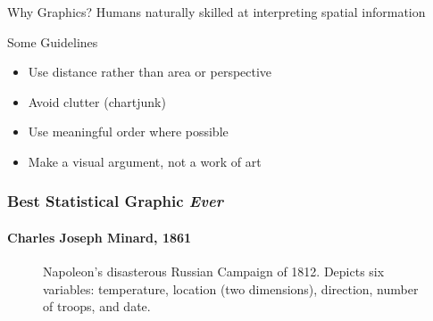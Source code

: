 \documentclass{beamer}
\begin{document}
\begin{frame}
\begin{columns}
	\vspace{5em}
\end{columns}

\end{frame}

\begin{frame}

	\begin{block}{Why Graphics?}
	Humans naturally skilled at interpreting spatial information
	\end{block}


\begin{block}{Some Guidelines}
	\begin{itemize}
		\item Use \alert{distance} rather than area or perspective
		\item Avoid clutter (chartjunk)
		\item Use meaningful order where possible
		\item Make a \alert{visual argument}, not a work of art
	\end{itemize}
\end{block}

\end{frame}

\begin{frame}
\singlespacing
\frametitle{Best Statistical Graphic \emph{Ever}}
\framesubtitle{Charles Joseph Minard, 1861 }
\begin{figure}
\caption{Napoleon's disasterous Russian Campaign of 1812. Depicts six variables: temperature, location (two dimensions), direction, number of troops, and date.}
\end{figure}

\end{frame}
\end{document}
